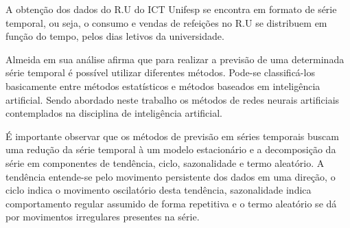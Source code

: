 A obtenção dos dados do R.U do ICT Unifesp se encontra em formato de série temporal, ou seja, o consumo e vendas de refeições no R.U se distribuem em função do tempo, pelos dias letivos da universidade.

Almeida \cite{Almeida2013} em sua análise afirma que para realizar a previsão de uma determinada série temporal é possível utilizar diferentes métodos. Pode-se classificá-los basicamente entre métodos estatísticos e métodos baseados em inteligência artificial. Sendo abordado neste trabalho os métodos de redes neurais artificiais contemplados na disciplina de inteligência artificial.
  
É importante observar que os métodos de previsão em séries temporais buscam uma redução da série temporal à um modelo estacionário e a decomposição da série em componentes de tendência, ciclo, sazonalidade e termo aleatório. A tendência entende-se pelo movimento persistente dos dados em uma direção, o ciclo indica o movimento oscilatório desta tendência, sazonalidade indica comportamento regular assumido de forma repetitiva e o termo aleatório se dá por movimentos irregulares presentes na série.


           
